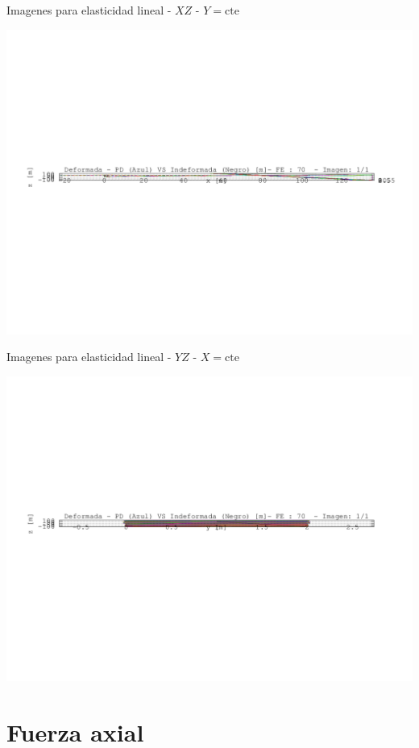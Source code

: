 \documentclass[a4paper,11pt]{article}
\begin{document}
\begin{center}       
Imagenes para elasticidad lineal -  $XZ$ - $Y=\text{cte}$ 

\includegraphics[width=.80\textwidth]{../../XY_XZ_YZ/XZ/deformada/grua_deformada_XZ_1.png}      

\end{center}       
\newpage       
\begin{center}       
Imagenes para elasticidad lineal -  $YZ$ - $X=\text{cte}$ 

\includegraphics[width=.80\textwidth]{../../XY_XZ_YZ/YZ/deformada/grua_deformada_YZ_1.png}      

\end{center}       
\newpage       

\section{Fuerza axial}
\end{document}
